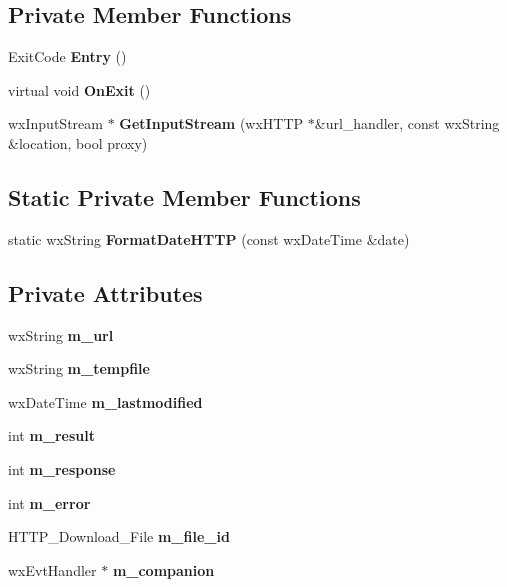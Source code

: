 \subsection*{Private Member Functions}
\begin{DoxyCompactItemize}
\item 
ExitCode {\bfseries Entry} ()\label{classCHTTPDownloadThread_a68a1db04d6c52f364d650ff0a1bc9a6c}

\item 
virtual void {\bfseries OnExit} ()\label{classCHTTPDownloadThread_a9e5db23e5f92ebafeb54b83518862f42}

\item 
wxInputStream $\ast$ {\bf GetInputStream} (wxHTTP $\ast$\&url\_\-handler, const wxString \&location, bool proxy)\label{classCHTTPDownloadThread_aef2d77af52d585142efa6e36999d29a1}

\end{DoxyCompactItemize}
\subsection*{Static Private Member Functions}
\begin{DoxyCompactItemize}
\item 
static wxString {\bfseries FormatDateHTTP} (const wxDateTime \&date)\label{classCHTTPDownloadThread_a84c04d035dc09760442335aca9f35255}

\end{DoxyCompactItemize}
\subsection*{Private Attributes}
\begin{DoxyCompactItemize}
\item 
wxString {\bfseries m\_\-url}\label{classCHTTPDownloadThread_a9aaa2d873e7e8961a35ab0c572c1a43f}

\item 
wxString {\bfseries m\_\-tempfile}\label{classCHTTPDownloadThread_ac68c9002d7cb3132d206dfe4f7bcaf8b}

\item 
wxDateTime {\bfseries m\_\-lastmodified}\label{classCHTTPDownloadThread_a1f4cf9b5019c9c925ba85dfbfebf07a3}

\item 
int {\bf m\_\-result}\label{classCHTTPDownloadThread_a0c1d31a7df5fb109d724a04aab14066a}

\item 
int {\bfseries m\_\-response}\label{classCHTTPDownloadThread_a95c245463c6e59d622a40e8330d1f4d3}

\item 
int {\bf m\_\-error}\label{classCHTTPDownloadThread_a9b2c1824d4a5057cf3a17786497d4d0c}

\item 
HTTP\_\-Download\_\-File {\bf m\_\-file\_\-id}
\item 
wxEvtHandler $\ast$ {\bfseries m\_\-companion}\label{classCHTTPDownloadThread_ab6e89c99962030758d7b0803b8f2f82c}

\end{DoxyCompactItemize}

